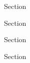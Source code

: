 \documentclass[12pt,letterpaper]{article}
\begin{document}

                  \hypertarget{7.1}{}
\begin{secbox}{Section}{

}\end{secbox}
                  \hypertarget{7.2}{}
\begin{secbox}{Section}{

}\end{secbox}
                  \hypertarget{7.3}{}
\begin{secbox}{Section}{

}\end{secbox}
                  \hypertarget{7.4}{}
\begin{secbox}{Section}{

}\end{secbox}
\end{document}
